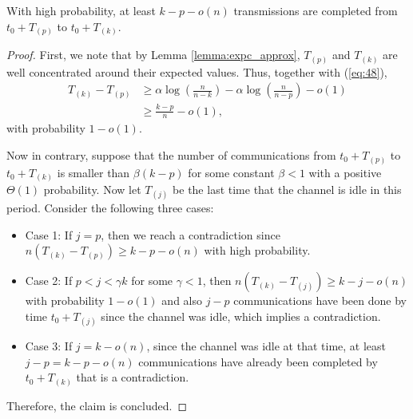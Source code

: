 \documentclass[onecolumn,journal,twoside]{IEEEtran}
\begin{document}
\iffalse
\begin{lemma}\label{lemma:main2}
With high probability, at least $k-p+1$ transmissions are completed from $t_0+T_{(p)}$ to $t_0+T_{(k)}$.
\end{lemma}
\begin{proof}
\begin{align}
    \Pr[ \text{at least $k-p+1$ complete transmission after $T_{(p)}$} ] & \geq \Pr(\bigcap^k_{i=p} \{D_i > \frac{1}{n}\})\nonumber\\
    &= 1-\Pr(\bigcup^k_{i=p} \{D_i \leq \frac{1}{n}\}) \nonumber\\
    & \geq 1- \sum_{i=p}^{k} \Pr(D_i \leq \frac{1}{n})\nonumber\\
    & = 1 - (k-p+1) \Theta(\frac{1}{n^2}) \nonumber\\
    &= 1- \Theta(\frac{1}{n})\nonumber\\
    &= 1-o(1).
\end{align} 
\end{proof}
\fi

\begin{lemma}\label{lemma:main2}
With high probability, at least $k-p-o(n)$ transmissions are completed from $t_0+T_{(p)}$ to $t_0+T_{(k)}$.
\end{lemma}
\begin{proof}
First, we note that by Lemma \ref{lemma:expc_approx}, $T_{(p)}$ and $T_{(k)}$ are well concentrated around their expected values. Thus, together with (\ref{eq:48}), 
\begin{align}
T_{(k)}-T_{(p)} &\geq \alpha \log (\frac{n}{n-k}) - \alpha \log (\frac{n}{n-p}) - o(1) \nonumber\\
&\geq \frac{k-p}{n} -o(1),
\end{align}
with probability $1-o(1)$.



Now in contrary, suppose that the number of communications from $t_0+T_{(p)}$ to $t_0+T_{(k)}$ is smaller than $\beta(k-p)$ for some constant $\beta < 1$ with a positive $\Theta(1)$ probability. Now let $T_{(j)}$ be the last time that the channel is idle in this period. Consider the following three cases:
\begin{itemize}
    \item Case 1: If $j = p$, then we reach a contradiction since $n(T_{(k)} - T_{(p)}) \geq  k-p - o(n)$ with high probability.
\item Case 2: If $p < j < \gamma k$ for some $\gamma <1$, then $n(T_{(k)} - T_{(j)}) \geq  k-j-   o(n)$ with probability $1 - o(1)$ and also $j-p$ communications have been done by time $t_0+T_{(j)}$ since the channel was idle, which implies a contradiction.
\item Case 3: If $j = k - o(n)$, since the channel was idle at that time, at least $j-p=k - p-o(n)$ communications have already been completed by $t_0+T_{(k)}$ that is a contradiction.
\end{itemize}
Therefore, the claim is concluded.

\end{proof}
\end{document}
